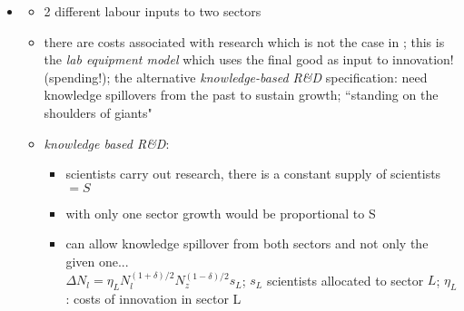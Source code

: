 \documentclass[12pt]{article}
\begin{document}
\begin{itemize}
\begin{itemize}
\end{itemize}
\item \cite{Acemoglu2002DirectedChange}
\begin{itemize}
\item 2 different labour inputs to two sectors
\item there are costs associated with research which is not the case in \cite{Acemoglu2012TheChange}; this is the \textit{lab equipment model} which uses the final good as input to innovation!  (spending!); the alternative \textit{knowledge-based R\&D} specification: need knowledge spillovers from the past to sustain growth; ``standing on the shoulders of giants"
\item \textit{knowledge based R\&D}: 
\begin{itemize}
\item scientists carry out research, there is a constant supply of scientists $=S$
\item with only one sector growth would be proportional to S
\item can allow knowledge spillover from both sectors and not only the given one... \\
$\Delta N_l=\eta_L N_l^{(1+\delta)/2}N_z ^{(1-\delta)/2}s_L$; $s_L$ scientists allocated to sector $L$; $\eta_L$: costs of innovation in sector L

\end{itemize}
\end{itemize}
\end{itemize}
\end{document}
